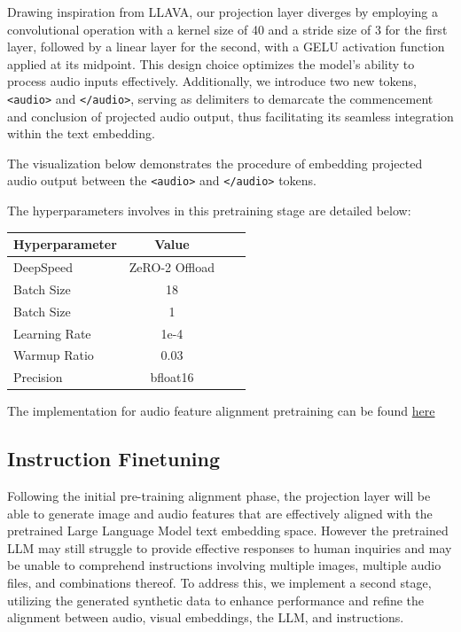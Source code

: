 \documentclass[preprint]{article}
\begin{document}
Drawing inspiration from LLAVA, our projection layer diverges by employing a convolutional operation with a kernel size of 40 and a stride size of 3 for the first layer, followed by a linear layer for the second, with a GELU activation function applied at its midpoint. This design choice optimizes the model's ability to process audio inputs effectively. Additionally, we introduce two new tokens, \texttt{<audio>} and \texttt{</audio>}, serving as delimiters to demarcate the commencement and conclusion of projected audio output, thus facilitating its seamless integration within the text embedding.

The visualization below demonstrates the procedure of embedding projected audio output between the \texttt{<audio>} and \texttt{</audio>} tokens.

The hyperparameters involves in this pretraining stage are detailed below:

\begin{table}[h]
  \centering
  \begin{tabular}{lccl}
    \hline
    \textbf{Hyperparameter} & \textbf{Value} \\
    \hline
    DeepSpeed               & ZeRO-2 Offload \\
    Batch Size              & 18             \\
    Batch Size              & 1              \\
    Learning Rate           & 1e-4           \\
    Warmup Ratio            & 0.03           \\
    Precision               & bfloat16       \\
    \hline
  \end{tabular}
\end{table}

The implementation for audio feature alignment pretraining can be found \href{https://github.com/mesolitica/multimodal-LLM/tree/master/audio-only}{here}

\subsection{Instruction Finetuning}

Following the initial pre-training alignment phase, the projection layer will be able to generate image and audio features that are effectively aligned with the pretrained Large Language Model text embedding space. However the pretrained LLM may still struggle to provide effective responses to human inquiries and may be unable to comprehend instructions involving multiple images, multiple audio files, and combinations thereof. To address this, we implement a second stage, utilizing the generated synthetic data to enhance performance and refine the alignment between audio, visual embeddings, the LLM, and instructions.
\end{document}
